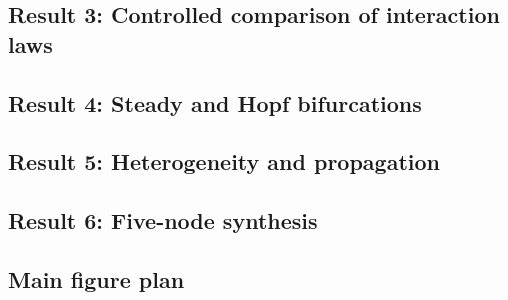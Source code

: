 \documentclass[11pt, reqno]{amsart}
\theoremstyle{definition}
\theoremstyle{remark}
\begin{document}
\subsection{Result 3: Controlled comparison of interaction laws}


\subsection{Result 4: Steady and Hopf bifurcations}


\subsection{Result 5: Heterogeneity and propagation}


\subsection{Result 6: Five-node synthesis}


\subsection{Main figure plan}
\end{document}

